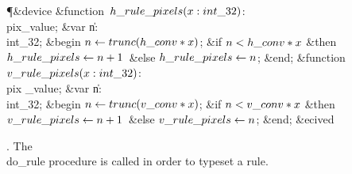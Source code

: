 \Y\P\&{device} \&{function}\1\  $\\{h\_rule\_pixels}(\|x:\\{int\_32})$: %
\\{pix\_value};\6
\4\&{var} \|n: \\{int\_32};\2\6
\&{begin} $\|n\K\\{trunc}(\\{h\_conv}\ast\|x)$;\6
\&{if} $\|n<\\{h\_conv}\ast\|x$ \1\&{then}\5
$\\{h\_rule\_pixels}\K\|n+1$\ \&{else} $\\{h\_rule\_pixels}\K\|n$;\2\6
\&{end};\7
\4\&{function}\1\  $\\{v\_rule\_pixels}(\|x:\\{int\_32})$: \\{pix%
\_value};\6
\4\&{var} \|n: \\{int\_32};\2\6
\&{begin} $\|n\K\\{trunc}(\\{v\_conv}\ast\|x)$;\6
\&{if} $\|n<\\{v\_conv}\ast\|x$ \1\&{then}\5
$\\{v\_rule\_pixels}\K\|n+1$\ \&{else} $\\{v\_rule\_pixels}\K\|n$;\2\6
\&{end};\6
\&{ecived}\par
\fi

. The \\{do\_rule} procedure is called in order to typeset a rule.


